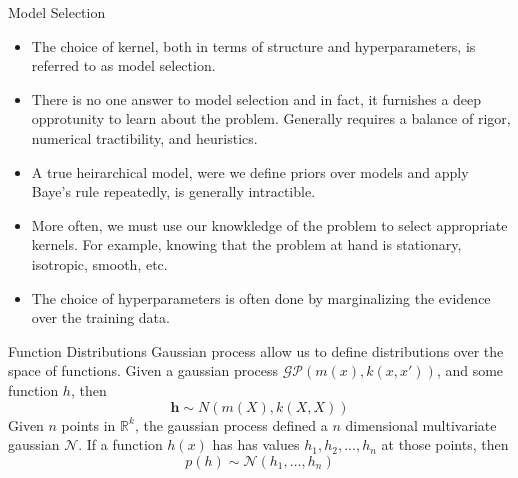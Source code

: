 \documentclass[10pt]{beamer}
\begin{document}
\begin{frame}{Model Selection}
  \begin{itemize}
  \item The choice of kernel, both in terms of structure and hyperparameters, is referred to as model selection. 
  \item There is no one answer to model selection and in fact, it furnishes a deep opprotunity to learn about the problem.
    Generally requires a balance of rigor, numerical tractibility, and heuristics.  
  \item A true heirarchical model, were we define priors over models and apply Baye's rule repeatedly, is generally intractible.
  \item More often, we must use our knowkledge of the problem to select appropriate kernels. For example, knowing that the problem at hand is stationary, isotropic, smooth, etc. 
  \item The choice of hyperparameters is often done by marginalizing the evidence over the training data.
  \end{itemize}
\end{frame}

\begin{frame}{Function Distributions}
  Gaussian process allow us to define distributions over the space of functions. Given a gaussian process $\mathcal{GP} \left( m(x) , k(x,x') \right)$, and some function $h$, then
  \begin{equation}
    \mathbf{h} \sim N(m(X) , k(X,X))
  \end{equation}
  Given $n$ points in $\mathbb{R}^{k}$, the gaussian process defined a $n$ dimensional multivariate gaussian $\mathcal{N}$. If a function $h(x)$ has has values $h_1,h_2,...,h_{n}$ at those points, then
  \begin{equation}
    p \left( h \right) \sim \mathcal{N}(h_{1}, ..., h_{n})
  \end{equation}

  \begin{center}
  \end{center}
\end{frame}
\end{document}

